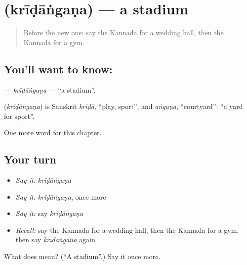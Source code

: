 \section[\texorpdfstring{\kn{ಕ್ರೀಡಾಂಗಣ} (krīḍāṅgaṇa)}{ಕ್ರೀಡಾಂಗಣ (krīḍāṅgaṇa)}]{ (krīḍāṅgaṇa) — a stadium}

\label{lesson:KA-C213-kridangana}



\begin{quote}
Before the new one: say the Kannada for a wedding hall, then the Kannada for a gym.
\end{quote}

\subsection*{You'll want to know: }
\textbf{} — \emph{krīḍāṅgaṇa} — \textquotedblleft{}a stadium\textquotedblright{}.

\begin{cousinweb}
\textbf{} (\emph{krīḍāṅgaṇa}) is Sanskrit \emph{krīḍā}, \textquotedblleft{}play, sport\textquotedblright{}, and \emph{aṅgaṇa}, \textquotedblleft{}courtyard\textquotedblright{}: \textquotedblleft{}a yard for sport\textquotedblright{}.
\end{cousinweb}

\begin{grammarlens}[title={What you've built}]
One more word for this chapter.
\end{grammarlens}

\subsection*{Your turn}
\begin{itemize}
\raggedright
  \item \emph{Say it:} \emph{krīḍāṅgaṇa}
  \item \emph{Say it:} \emph{krīḍāṅgaṇa}, once more
  \item \emph{Say it:} say \emph{krīḍāṅgaṇa}
  \item \emph{Recall:} say the Kannada for a wedding hall, then the Kannada for a gym, then say \emph{krīḍāṅgaṇa} again
\end{itemize}

\begin{tcolorbox}[breakable,colback=teal!4,colframe=teal!35!black,title={Before you move on}]
What does  mean? (\textquotedblleft{}A stadium\textquotedblright{}.) Say it once more.
\end{tcolorbox}
